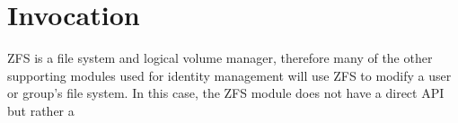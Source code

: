 \section{Invocation}

ZFS is a file system and logical volume manager, therefore many of the other supporting modules used for identity management will use ZFS to modify a user or group's file system. In this case, the ZFS module does not have a direct API but rather a 
